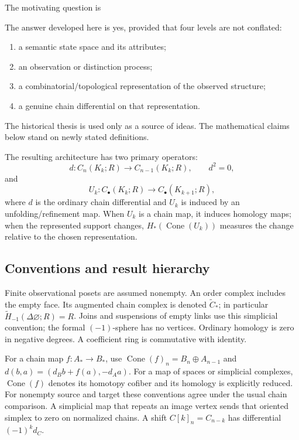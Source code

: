 \documentclass[11pt]{article}
\newcommand{\Cone}{\operatorname{Cone}}
\begin{document}
The motivating question is
\begin{center}
\end{center}
The answer developed here is yes, provided that four levels are not conflated:
\begin{enumerate}[label=(\roman*)]
\item a semantic state space and its attributes;
\item an observation or distinction process;
\item a combinatorial/topological representation of the observed structure;
\item a genuine chain differential on that representation.
\end{enumerate}
The historical thesis is used only as a source of ideas.  The mathematical claims below stand on newly stated definitions.

The resulting architecture has two primary operators:
\[
 d:C_n(K_k;R)\longrightarrow C_{n-1}(K_k;R),\qquad d^2=0,
\]
and
\[
 U_k:C_\bullet(K_k;R)\longrightarrow C_\bullet(K_{k+1};R),
\]
where $d$ is the ordinary chain differential and $U_k$ is induced by an unfolding/refinement map.  When $U_k$ is a chain map, it induces homology maps; when the represented support changes, $H_*(\Cone(U_k))$ measures the change relative to the chosen representation.

\subsection{Conventions and result hierarchy}
Finite observational posets are assumed nonempty.  An order complex includes
the empty face.  Its augmented chain complex is denoted $\widetilde C_*$;
in particular $\widetilde H_{-1}(\Delta\varnothing;R)=R$.
Joins and suspensions of empty links use this simplicial convention; the
formal $(-1)$-sphere has no vertices.  Ordinary homology is zero in negative
degrees.  A coefficient ring is commutative with identity.

For a chain map $f:A_*\to B_*$, use
$\Cone(f)_n=B_n\oplus A_{n-1}$ and
$d(b,a)=(d_Bb+f(a),-d_Aa)$.
For a map of spaces or simplicial complexes, $\Cone(f)$ denotes its homotopy
cofiber and its homology is explicitly reduced.  For nonempty source and
target these conventions agree under the usual chain comparison.  A simplicial
map that repeats an image vertex sends that oriented simplex to zero on
normalized chains.  A shift $C[k]_n=C_{n-k}$ has differential $(-1)^k d_C$.
\end{document}
